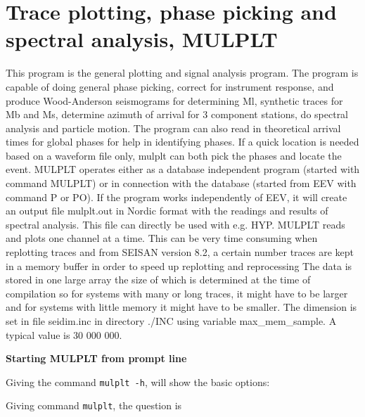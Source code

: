 %
%
\section{Trace plotting, phase picking and spectral analysis, MULPLT}
\label{sect:mulplt}

This program is the general plotting and signal analysis  program. The program is capable of doing general phase picking, correct for instrument response, and produce Wood-Anderson seismograms for determining Ml, synthetic traces for Mb and Ms, determine azimuth of arrival for 3 component stations, do spectral analysis and particle motion. The program can also read in theoretical arrival times for global phases for help in identifying phases. If a quick location is needed based on a waveform file only, mulplt can both pick the phases and locate the event. MULPLT operates either as a database independent program (started with command MULPLT) or in connection with the database (started from EEV with command P or PO). If the program works independently of EEV, it will create an output file mulplt.out in Nordic format with the readings and results of spectral analysis. This file can directly be used with e.g. HYP. MULPLT reads and plots one channel at a time. This can be very time consuming when replotting traces and from SEISAN version 8.2, a certain number traces are kept in a memory buffer in order to speed up replotting and reprocessing The data is stored in one large array the size of which is determined at the time of compilation so for systems with many or long traces, it might have to be larger and for systems with little memory it might have to be smaller. The dimension is set in file seidim.inc in directory ./INC using variable max\_mem\_sample. A typical value is 30 000 000. 

\textbf{Starting MULPLT from prompt line}

Giving the command \texttt{mulplt -h}, will show the basic options:


Giving command \texttt{mulplt}, the question is 


